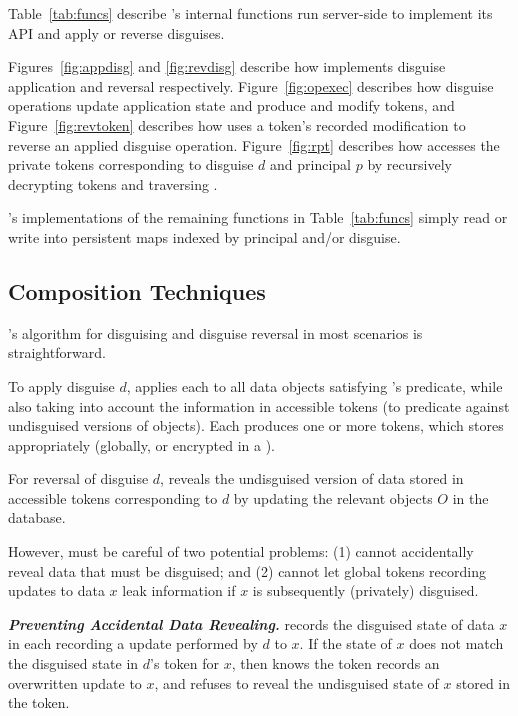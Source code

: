 Table~\ref{tab:funcs} describe \sys's internal functions run server-side to implement its API 
and apply or reverse disguises. 

Figures~\ref{fig:appdisg} and \ref{fig:revdisg} describe how \sys implements disguise application and
reversal respectively. Figure~\ref{fig:opexec} describes how disguise operations update application
state and produce and modify tokens, and 
Figure~\ref{fig:revtoken} describes how \sys uses a token's recorded
modification to reverse an applied disguise operation. 
Figure~\ref{fig:rpt} describes how \sys accesses the private tokens
corresponding to disguise $d$ and principal $p$ by recursively decrypting tokens and traversing
.

\sys's implementations of the remaining functions in Table~\ref{tab:funcs} simply read or write into
persistent maps indexed by principal and/or disguise.

\subsection{Composition Techniques}
\sys's algorithm for disguising and disguise reversal in most scenarios is straightforward. 

To apply disguise $d$, \sys applies each  to all
data objects satisfying 's predicate, while also taking into account the information in
accessible tokens (to \eg predicate against undisguised versions of objects). Each  produces
one or more tokens, which \sys stores appropriately (globally, or encrypted in a ).

For reversal of disguise $d$, \sys reveals the undisguised version of data stored in accessible tokens
corresponding to $d$ by updating the relevant objects $O$ in the database.

However, \sys must be careful of two potential problems:
(1) \sys cannot accidentally reveal data that must be disguised; and (2) \sys cannot let global
tokens recording updates to data $x$ leak information if $x$ is subsequently (privately) disguised.

\vspace{6pt}\noindent\textbf{\emph{Preventing Accidental Data Revealing.}}
\sys records the disguised state of data $x$ in each  recording a update performed by $d$
to $x$. If the state of $x$ does not match the disguised state in $d$'s token for $x$, then \sys
knows the token records an overwritten update to $x$, and refuses to reveal the undisguised state of $x$
stored in the token.

